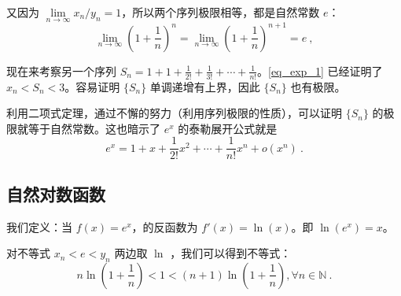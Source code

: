 又因为 $\lim\limits_{n\rightarrow \infty} x_n/y_n = 1$，所以两个序列极限相等，都是自然常数 $e$：
\begin{equation}\label{eq_exp_2}
\lim\limits_{n\rightarrow \infty} \left(1+\frac{1}{n}\right)^n=\lim\limits_{n\rightarrow \infty} \left(1+\frac{1}{n}\right)^{n+1}=e~,
\end{equation}

现在来考察另一个序列 $S_n=1+1+\frac{1}{2!}+\frac{1}{3!}+\cdots+\frac{1}{n!}$。\autoref{eq_exp_1} 已经证明了 $x_n<S_n<3$。容易证明 $\{S_n\}$ 单调递增有上界，因此 $\{S_n\}$ 也有极限。

利用二项式定理，通过不懈的努力（利用序列极限的性质），可以证明 $\{S_n\}$ 的极限就等于自然常数。这也暗示了 $e^x$ 的泰勒展开公式就是
\begin{equation}
e^x=1+x+\frac{1}{2!}x^2+\cdots+\frac{1}{n!}x^n +o(x^n)~.
\end{equation}

\subsection{自然对数函数}
我们定义：当 $f(x)=e^x$，的反函数为 $f'(x)=\ln(x)$。即 $\ln(e^x)=x$。

对不等式 $x_n<e<y_n$ 两边取 $\ln$ ，我们可以得到不等式：
\begin{equation}
  n\ln\left(1+\frac{1}{n}\right)<1<(n+1)\ln\left(1+\frac{1}{n}\right), \forall n \in \mathbb{N}~.
\end{equation}


